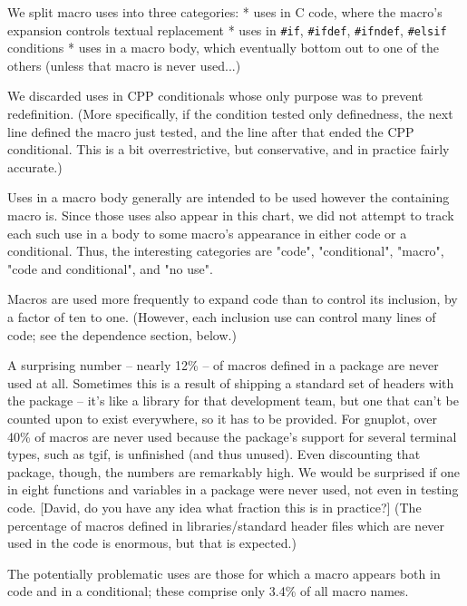 \documentclass[10pt]{article}
\begin{document}
    We split macro uses into three categories:  
        * uses in C code, where the macro's expansion controls textual
            replacement
        * uses in {\tt \#if}, {\tt \#ifdef}, {\tt \#ifndef}, {\tt \#elsif} conditions
        * uses in a macro body, which eventually bottom out to one of the
            others (unless that macro is never used...)

      We discarded uses in CPP conditionals whose only purpose was to
        prevent redefinition.  (More specifically, if the condition tested
        only definedness, the next line defined the macro just tested, and
        the line after that ended the CPP conditional.  This is a bit
        overrestrictive, but conservative, and in practice fairly accurate.)

      Uses in a macro body generally are intended to be used however the
        containing macro is.  Since those uses also appear in this chart,
        we did not attempt to track each such use in a body to some macro's
        appearance in either code or a conditional.  Thus, the interesting
        categories are "code", "conditional", "macro", "code and
        conditional", and "no use".

      Macros are used more frequently to expand code than to control its
        inclusion, by a factor of ten to one.  (However, each inclusion use
        can control many lines of code; see the dependence section, below.)

      A surprising number -- nearly 12\% -- of macros defined in a package
        are never used at all.  Sometimes this is a result of shipping a
        standard set of headers with the package -- it's like a library for
        that development team, but one that can't be counted upon to exist
        everywhere, so it has to be provided.  For gnuplot, over 40\% of
        macros are never used because the package's support for several
        terminal types, such as tgif, is unfinished (and thus unused).
        Even discounting that package, though, the numbers are remarkably
        high.  We would be surprised if one in eight functions and
        variables in a package were never used, not even in testing code.
        [David, do you have any idea what fraction this is in practice?]
        (The percentage of macros defined in libraries/standard header
        files which are never used in the code is enormous, but that is
        expected.)

      The potentially problematic uses are those for which a macro appears
        both in code and in a conditional; these comprise only 3.4\% of all
        macro names.
\end{document}
